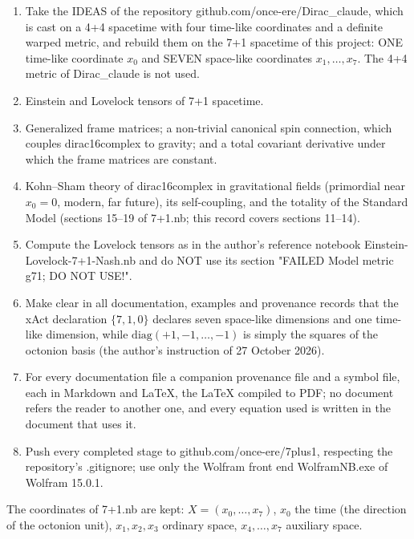 \documentclass[10pt,a4paper]{article}
\begin{document}
\begin{enumerate}
\item Take the IDEAS of the repository github.com/once-ere/Dirac\_claude, which is cast on a 4+4 spacetime with four time-like coordinates and a definite warped metric, and rebuild them on the 7+1 spacetime of this project: ONE time-like coordinate $x_0$ and SEVEN space-like coordinates $x_1,\dots,x_7$. The 4+4 metric of Dirac\_claude is not used.
\item Einstein and Lovelock tensors of 7+1 spacetime.
\item Generalized frame matrices; a non-trivial canonical spin connection, which couples dirac16complex to gravity; and a total covariant derivative under which the frame matrices are constant.
\item Kohn–Sham theory of dirac16complex in gravitational fields (primordial near $x_0=0$, modern, far future), its self-coupling, and the totality of the Standard Model (sections 15–19 of 7+1.nb; this record covers sections 11–14).
\item Compute the Lovelock tensors as in the author’s reference notebook Einstein-Lovelock-7+1-Nash.nb and do NOT use its section "FAILED Model metric g71; DO NOT USE!".
\item Make clear in all documentation, examples and provenance records that the xAct declaration $\{7,1,0\}$ declares seven space-like dimensions and one time-like dimension, while $\mathrm{diag}(+1,-1,\dots,-1)$ is simply the squares of the octonion basis (the author’s instruction of 27 October 2026).
\item For every documentation file a companion provenance file and a symbol file, each in Markdown and LaTeX, the LaTeX compiled to PDF; no document refers the reader to another one, and every equation used is written in the document that uses it.
\item Push every completed stage to github.com/once-ere/7plus1, respecting the repository’s .gitignore; use only the Wolfram front end WolframNB.exe of Wolfram 15.0.1.
\end{enumerate}
The coordinates of 7+1.nb are kept: $X=(x_0,\dots,x_7)$, $x_0$ the time (the direction of the octonion unit), $x_1,x_2,x_3$ ordinary space, $x_4,\dots,x_7$ auxiliary space.
\end{document}
